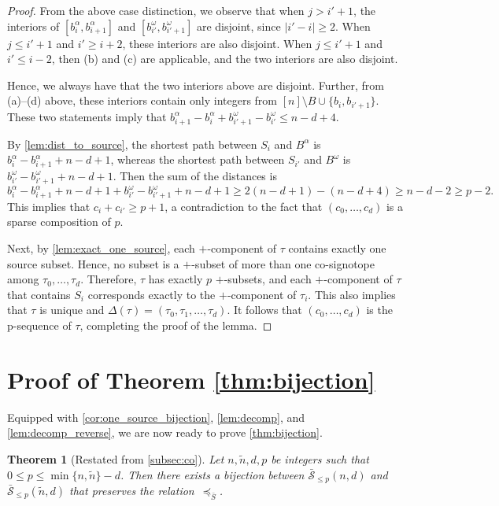 \documentclass[a4paper,11pt]{amsart}
\newtheorem{theorem}{Theorem}
\newcommand{\calS}{\mathcal{S}}
\newcommand{\tn}{\tilde{n}}
\begin{document}
\begin{proof}
    From the above case distinction, we observe that when $j > i'+1$, the interiors of $[b^{\alpha}_i, b^{\alpha}_{i+1}]$ and $[b^{\omega}_{i'}, b^{\omega}_{i'+1}]$ are disjoint, since $|i'-i| \geq 2$.
    When $j \leq i' + 1$ and $i' \geq i + 2$, these interiors are also disjoint.
    When $j \leq i' + 1$ and $i' \leq i - 2$, then (b) and (c) are applicable, and the two interiors are also disjoint.

    Hence, we always have that the two interiors above are disjoint.
    Further, from (a)--(d) above, these interiors contain only integers from $[n] \setminus B \cup \{b_i, b_{i'+1}\}$.
    These two statements imply that $b^{\alpha}_{i+1} - b^{\alpha}_i + b^{\omega}_{i'+1} - b^{\omega}_{i'} \leq n-d + 4$.
    
	By \cref{lem:dist_to_source}, the shortest path between $S_i$ and $B^{\alpha}$ is $b^{\alpha}_i - b^{\alpha}_{i+1} + n -d + 1$, whereas the shortest path between $S_{i'}$ and $B^{\omega}$ is $b^{\omega}_{i'} - b^{\omega}_{i'+1} + n -d + 1$.
	Then the sum of the distances is 
	\[
	    b^{\alpha}_i - b^{\alpha}_{i+1} + n -d + 1 + b^{\omega}_{i'} - b^{\omega}_{i'+1} + n -d + 1 \geq
        2(n-d+1) - (n-d+4) \geq n-d-2 \geq p-2.
	\]
    This implies that $c_i + c_{i'} \geq p+1$, a contradiction to the fact that $(c_0, \dots, c_d)$ is a sparse composition of $p$.
	
	Next, by \cref{lem:exact_one_source}, each $+$-component of $\tau$ contains exactly one source subset.
    Hence, no subset is a $+$-subset of more than one co-signotope among $\tau_0, \dots, \tau_d$.
    Therefore, $\tau$ has exactly $p$ $+$-subsets, and each $+$-component of $\tau$ that contains $S_i$ corresponds exactly to the $+$-component of $\tau_i$.
    This also implies that $\tau$ is unique and $\Delta(\tau) = (\tau_0,\tau_1,\dots,\tau_d)$.
    It follows that $(c_0, \dots, c_d)$ is the p-sequence of $\tau$, completing the proof of the lemma.	
\end{proof}

\section{Proof of Theorem \ref{thm:bijection}}
\label{sec:main_proof}

Equipped with \cref{cor:one_source_bijection}, \cref{lem:decomp}, and \cref{lem:decomp_reverse}, we are now ready to prove \cref{thm:bijection}.

\begingroup
\def\thetheorem{\ref{thm:bijection}}
\begin{theorem}[Restated from \cref{subsec:co}]
    Let $n, \tilde{n}, d, p$ be integers such that $0\leq p \leq \min\{n,\tn\}-d$.
    Then there exists a bijection between $\bar{\calS}_{\leq p}(n,d)$ and $\bar{\calS}_{\leq p}(\tn,d)$ that preserves the relation~$\preceq_{\bar{S}}$.
\end{theorem}
\addtocounter{theorem}{-1}
\endgroup
\end{document}
